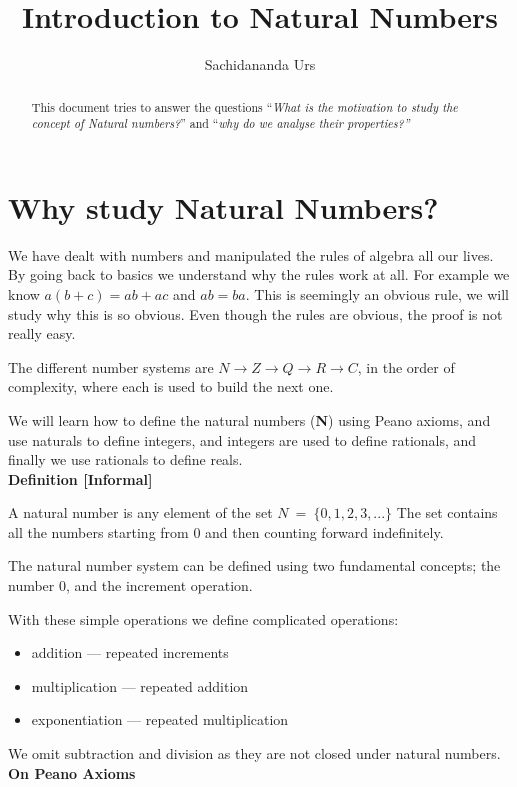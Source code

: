 \documentclass[10pt]{article}
\title{Introduction to Natural Numbers}
\author{Sachidananda Urs}
\begin{document}
\maketitle

\begin{abstract}
This document tries to answer the questions ``\emph{What is the motivation to
study the concept of Natural numbers?}'' and ``\emph{why do we analyse their
properties?''}
\end{abstract}

\section*{Why study Natural Numbers?}
We have dealt with numbers and manipulated the rules of algebra all our
lives. By going back to basics we understand why the rules work at all. For
example we know $ a(b+c) = ab + ac $ and $ab = ba$. This is seemingly an obvious
rule, we will study why this is so obvious. Even though the rules are obvious,
the proof is not really easy.

The different number systems are $ N \to Z \to Q \to R \to C $, in the order of
complexity, where each is used to build the next one.

We will learn how to define the natural numbers (\textbf{N}) using Peano axioms,
and use naturals to define integers, and integers are used to define rationals,
and finally we use rationals to define reals.
\\[6pt]
\textbf {Definition [Informal]}

A natural number is any element of the set $ N~=~\{0, 1, 2, 3, ... \} $
The set contains all the numbers starting from 0 and then counting forward
indefinitely.

The natural number system can be defined using two fundamental concepts; the
number 0, and the increment operation.

With these simple operations we define complicated operations:
\begin{itemize}
\setlength{\itemsep}{0pt}
\item[] addition --- repeated increments
\item[] multiplication --- repeated addition
\item[] exponentiation --- repeated multiplication
\end{itemize}

We omit subtraction and division as they are not closed under natural numbers.
\\[6pt]
\textbf{On Peano Axioms}
\end{document}

